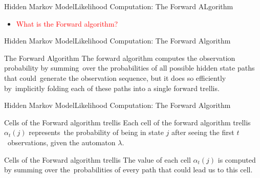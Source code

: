 \documentclass[10pt]{beamer}
\begin{document}
\begin{frame}{Hidden Markov Model}{Likelihood Computation: The Forward ALgorithm}
    \begin{itemize}
      \item \textcolor{red}{What is the Forward algorithm?}
    \end{itemize}
\end{frame}

\begin{frame}{Hidden Markov Model}{Likelihood Computation: The Forward Algorithm}
    \begin{block}{The Forward Algorithm}
        The forward algorithm computes the observation probability by summing\
        over the probabilities of all possible hidden state paths that could\  
        generate the observation sequence, but it does so efficiently by\
        implicitly folding each of these paths into a single forward trellis.
    \end{block}
\end{frame}

\begin{frame}{Hidden Markov Model}{Likelihood Computation: The Forward Algorithm}
    \begin{block}{Cells of the Forward algorithm trellis}
         Each cell of the forward algorithm trellis $\alpha_t(j)$ represents\
         the probability of being in state $j$ after seeing the first $t$\
         observations, given the automaton $\lambda$.
    \end{block}
    \begin{block}{Cells of the Forward algorithm trellis}
         The value of each cell $\alpha_t(j)$ is computed by summing over the\
         probabilities of every path that could lead us to this cell.
    \end{block}
\end{frame}
\end{document}
